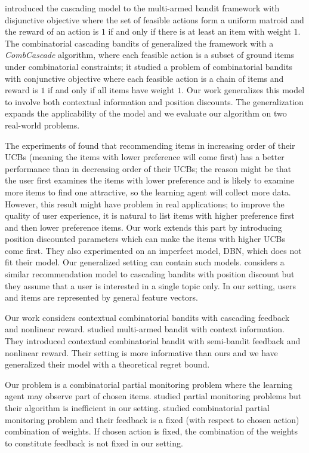 \documentclass{article}
\begin{document}
\cite{kveton2015cascading} introduced the cascading model to the multi-armed bandit framework with disjunctive objective where the set of feasible actions form a uniform matroid and the reward of an action is $1$ if and only if there is at least an item with weight $1$. The combinatorial cascading bandits of \cite{kveton2015combinatorial} generalized the framework with a {\it CombCascade} algorithm, where each feasible action is a subset of ground items under combinatorial constraints; it studied a problem of combinatorial bandits with conjunctive objective where each feasible action is a chain of items and reward is $1$ if and only if all items have weight $1$. Our work generalizes this model to involve both contextual information and position discounts. The generalization expands the applicability of the model and we evaluate our algorithm on two real-world problems. 

The experiments of \cite{kveton2015cascading} found that recommending items in increasing order of their UCBs (meaning the items with lower preference will come first) has a better performance than in decreasing order of their UCBs; the reason might be that the user first examines the items with lower preference and is likely to examine more items to find one attractive, so the learning agent will collect more data. However, this result might have problem in real applications; to improve the quality of user experience, it is natural to list items with higher preference first and then lower preference items. Our work extends this part by introducing position discounted parameters which can make the items with higher UCBs come first. They also experimented on an imperfect model, DBN, which does not fit their model. Our generalized setting can contain such models. \cite{combes2015learning} considers a similar recommendation model to cascading bandits with position discount but they assume that a user is interested in a single topic only. In our setting, users and items are represented by general feature vectors.

Our work considers contextual combinatorial bandits with cascading feedback and nonlinear reward. \cite{li2010contextual} studied multi-armed bandit with context information. They introduced contextual combinatorial bandit with semi-bandit feedback and nonlinear reward. Their setting is more informative than ours and we have generalized their model with a theoretical regret bound.

Our problem is a combinatorial partial monitoring problem where the learning agent may observe part of chosen items. \cite{agrawal1989asymptotically,bartok2012adaptive} studied partial monitoring problems but their algorithm is inefficient in our setting. \cite{lin2014combinatorial} studied combinatorial partial monitoring problem and their feedback is a fixed (with respect to chosen action) combination of weights. If chosen action is fixed, the combination of the weights to constitute feedback is not fixed in our setting.
\end{document}
